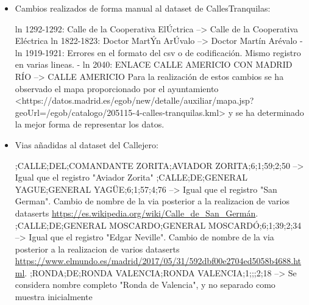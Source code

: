 \begin{itemize}

	\item Cambios realizados de forma manual al dataset de CallesTranquilas:
\begin{tiny}
\newline ln 1292-1292: Calle de la Cooperativa ElÚctrica --> Calle de la Cooperativa Eléctrica
\newline ln 1822-1823: Doctor MartÝn ArÚvalo --> Doctor Martín Arévalo
\newline - ln 1919-1921: Errores en el formato del csv o de codificación. Mismo registro en varias lineas.
\newline - ln 2040: ENLACE CALLE AMERICIO CON MADRID RÍO --> CALLE AMERICIO
\newline 
Para la realización de estos cambios se ha observado el mapa proporcionado por el ayuntamiento <https://datos.madrid.es/egob/new/detalle/auxiliar/mapa.jsp?geoUrl=/egob/catalogo/205115-4-calles-tranquilas.kml> y se ha determinado la mejor forma de representar los datos.
\newline 
\end{tiny}









	\item Vias añadidas al dataset del Callejero:
\begin{tiny}
;CALLE;DEL;COMANDANTE ZORITA;AVIADOR ZORITA;6;1;59;2;50 --> Igual que el registro "Aviador Zorita"
;CALLE;DE;GENERAL YAGUE;GENERAL YAGÜE;6;1;57;4;76 --> Igual que el registro "San German". Cambio de nombre de la via posterior a la realizacion de varios dataserts \url{https://es.wikipedia.org/wiki/Calle_de_San_Germán}.
;CALLE;DE;GENERAL MOSCARDO;GENERAL MOSCARDÓ;6;1;39;2;34 --> Igual que el registro "Edgar Neville". Cambio de nombre de la via posterior a la realizacion de varios dataserts \url{https://www.elmundo.es/madrid/2017/05/31/592dbf00e2704ed5058b4688.html}.
;RONDA;DE;RONDA VALENCIA;RONDA VALENCIA;1;;;2;18 --> Se considera nombre completo "Ronda de Valencia", y no separado como muestra inicialmente
\newline
\end{tiny}


\end{itemize}
